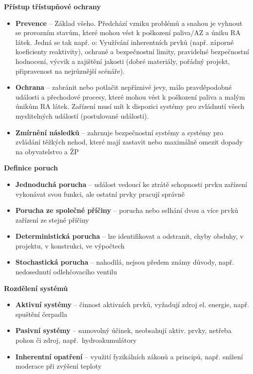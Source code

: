 \textbf{Přístup třístupňové ochrany}

\begin{itemize}
    \item \textbf{Prevence} -- Základ všeho. Předchází vzniku problémů a snahou je vyhnout se provozním stavům, které mohou vést k poškození paliva/AZ a úniku RA látek. Jedná se tak např. o: Využívání inherentních prvků (např. záporné koeficienty reaktivity), ochrané a bezpečnostní limity, pravidelné bezpečnostní hodnocení, výcvik a zajištění jakosti (dobré materiály, pořádný projekt, připravenost na nejrůznější scénáře).

    \item \textbf{Ochrana} -- zabránit nebo potlačit nepříznivé jevy, málo pravděpodobné události a přechodové procesy, které mohou vést k poškození paliva a malým únikům RA látek. Zařízení musí mít k dispozici systémy pro zvládnutí všech myslitelných událostí (postulované události).

    \item \textbf{Zmírnění následků} -- zahrnuje bezpečnostní systémy a systémy pro zvládání těžkých nehod, které mají zastavit nebo maximálně omezit dopady na obyvatelstvo a ŽP
\end{itemize}


\textbf{Definice poruch}

\begin{itemize}
    \item \textbf{Jednoduchá porucha} -- událost vedoucí ke ztrátě schopnosti prvku zařízení vykonávat svou funkci, ale ostatní prvky pracují správně

    \item \textbf{Porucha ze společné příčiny} -- porucha nebo selhání dvou a více prvků zařízení ze stejné příčiny

    \item \textbf{Deterministická porucha} -- lze identifikovat a odstranit, chyby obsluhy, v projektu, v konstrukci, ve výpočtech

    \item \textbf{Stochastická porucha} -- nahodilá, nejsou předem známy důvody, např. nedosednutí odlehčovacího ventilu
\end{itemize}

\textbf{Rozdělení systémů}

\begin{itemize}
    \item \textbf{Aktivní systémy} -- činnost aktivních prvků, vyžadují zdroj el. energie, např. spuštění čerpadla

    \item  \textbf{Pasivní systémy} -- samovolný účinek, neobsahují aktiv. prvky, netřeba pohon či zdroj, např.~hydroakumulátory

    \item  \textbf{Inherentní opatření} -- využití fyzikálních zákonů a principů, např. snížení moderace při zvýšení teploty
\end{itemize}

